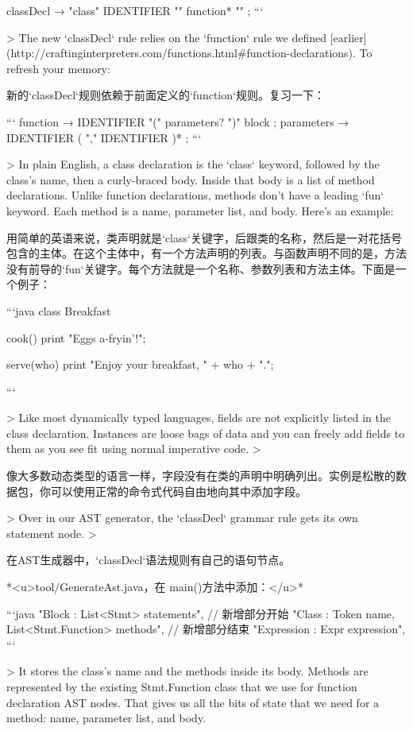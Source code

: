 \documentclass[cn,11pt,chinese]{elegantbook}
\begin{document}
{{{{{{{{{{{{{{{{{{classDecl      → "class" IDENTIFIER "{" function* "}" ;
```

> The new `classDecl` rule relies on the `function` rule we defined [earlier](http://craftinginterpreters.com/functions.html#function-declarations). To refresh your memory:

新的`classDecl`规则依赖于前面定义的`function`规则。复习一下：

```
function       → IDENTIFIER "(" parameters? ")" block ;
parameters     → IDENTIFIER ( "," IDENTIFIER )* ;
```

> In plain English, a class declaration is the `class` keyword, followed by the class’s name, then a curly-braced body. Inside that body is a list of method declarations. Unlike function declarations, methods don’t have a leading `fun` keyword. Each method is a name, parameter list, and body. Here’s an example:

用简单的英语来说，类声明就是`class`关键字，后跟类的名称，然后是一对花括号包含的主体。在这个主体中，有一个方法声明的列表。与函数声明不同的是，方法没有前导的`fun`关键字。每个方法就是一个名称、参数列表和方法主体。下面是一个例子：

```java
class Breakfast {
  cook() {
    print "Eggs a-fryin'!";
  }

  serve(who) {
    print "Enjoy your breakfast, " + who + ".";
  }
}
```

> Like most dynamically typed languages, fields are not explicitly listed in the class declaration. Instances are loose bags of data and you can freely add fields to them as you see fit using normal imperative code.
>

像大多数动态类型的语言一样，字段没有在类的声明中明确列出。实例是松散的数据包，你可以使用正常的命令式代码自由地向其中添加字段。

> Over in our AST generator, the `classDecl` grammar rule gets its own statement node.
>

在AST生成器中，`classDecl`语法规则有自己的语句节点。

*<u>tool/GenerateAst.java，在 main()方法中添加：</u>*

```java
      "Block      : List<Stmt> statements",
      // 新增部分开始
      "Class      : Token name, List<Stmt.Function> methods",
      // 新增部分结束
      "Expression : Expr expression",
```

> It stores the class’s name and the methods inside its body. Methods are represented by the existing Stmt.Function class that we use for function declaration AST nodes. That gives us all the bits of state that we need for a method: name, parameter list, and body.

}}}}}}}}}}}}}}}}}}
\end{document}
